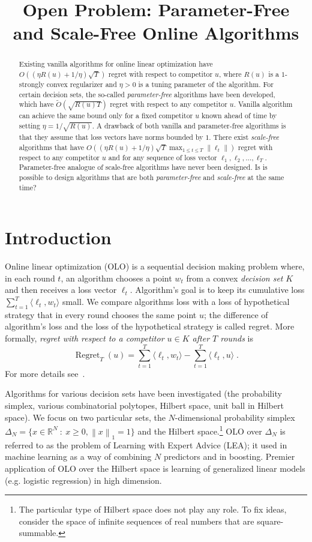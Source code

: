 \documentclass{colt2016} %
\title{Open Problem: Parameter-Free and Scale-Free Online Algorithms}
\DeclareMathOperator{\Regret}{Regret}
\newcommand{\R}{\mathbb{R}}     %
\newcommand{\norm}[1]{\left\|{#1}\right\|}
\begin{document}
\maketitle

\begin{abstract}
Existing vanilla algorithms for online linear optimization have
$O((\eta R(u) + 1/\eta) \sqrt{T})$ regret with respect to competitor $u$,
where $R(u)$ is a $1$-strongly convex regularizer and $\eta > 0$ is a
tuning parameter of the algorithm. For certain decision sets, the
so-called \emph{parameter-free} algorithms have been developed, which have
$\widetilde O(\sqrt{R(u) T})$ regret with respect to any competitor $u$.
Vanilla algorithm can achieve the same bound only for a fixed competitor
$u$ known ahead of time by setting $\eta = 1/\sqrt{R(u)}$. A drawback of
both vanilla and parameter-free algorithms is that they assume that loss vectors
have norms bounded by $1$. There exist \emph{scale-free} algorithms that have
$O((\eta R(u) + 1/\eta) \sqrt{T} \max_{1 \le t \le T} \norm{\ell_t})$
regret with respect to any competitor $u$ and for any sequence of loss
vector $\ell_1, \ell_2, \dots, \ell_T$. Parameter-free analogue of scale-free
algorithms have never been designed. Is is possible to design algorithms that
are both \emph{parameter-free} and \emph{scale-free} at the same time?
\end{abstract}

\section{Introduction}

Online linear optimization (OLO) is a sequential decision making problem where,
in each round $t$, an algorithm chooses a point $w_t$ from a convex
\emph{decision set} $K$ and then receives a loss vector $\ell_t$. Algorithm's
goal is to keep its cumulative loss $\sum_{t=1}^T \langle \ell_t, w_t \rangle$
small. We compare algorithms loss with a loss of hypothetical strategy that in
every round chooses the same point $u$; the difference of algorithm's  loss and
the loss of the hypothetical strategy is called regret. More formally,
\emph{regret with respect to a competitor $u \in K$ after $T$ rounds} is
$$
\Regret_T(u) = \sum_{t=1}^T \langle \ell_t, w_t \rangle - \sum_{t=1}^T \langle \ell_t, u \rangle \; .
$$
For more details see~\cite{Cesa-Bianchi-Lugosi-2006, Shalev-Shwartz-2011}.

Algorithms for various decision sets have been investigated (the probability
simplex, various combinatorial polytopes, Hilbert space, unit ball in Hilbert
space). We focus on two particular sets, the $N$-dimensional probability
simplex $\Delta_N = \{ x \in \R^N ~:~ x \ge 0, \norm{x}_1 = 1\}$ and the
Hilbert space.\footnote{The particular type of Hilbert space does not play any
role. To fix ideas, consider the space of infinite sequences of real numbers
that are square-summable.} OLO over $\Delta_N$ is referred to as the problem of
Learning with Expert Advice (LEA); it used in machine learning as a way of
combining $N$ predictors and in boosting. Premier application of OLO over the
Hilbert space is learning of generalized linear models (e.g. logistic
regression) in high dimension.
\end{document}
